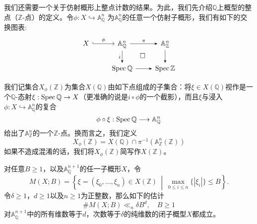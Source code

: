 我们还需要一个关于仿射概形上整点计数的结果。为此，我们先介绍$\mathbb{Q}$上概型的整点（$\mathbb{Z}$-点）的定义。令$\phi: X \hookrightarrow \mathbb{A}^n_{\mathbb{Q}}$ 为$\mathbb{A}^n_{\mathbb{Q}}$的任意一个仿射子概形，我们有如下的交换图表:
\begin{equation}
\begin{tikzcd}[arrows = {-Stealth}]
X \arrow[r, hookrightarrow, "\phi"] & \mathbb{A}^n_{\mathbb{Q}} \arrow[r, "\pi"] \arrow[d, "i"'] \arrow[dr, phantom, "\square"] & \mathbb{A}^n_{\mathbb{Z}} \arrow[d] \\
& \spec\mathbb{Q} \arrow[r] & \spec\mathbb{Z}
\end{tikzcd}
\end{equation}
\begin{definition} \label{Z-point of a Q-scheme}
我们记集合$X_{\phi}(\mathbb{Z})$为集合$X(\mathbb{Q})$由如下点组成的子集合：将$\xi \in X(\mathbb{Q})$视作是一个$\mathbb{Q}$-态射$\xi: \operatorname{Spec}\mathbb{Q}\to X$（更准确的说是$i\circ\phi$的一个截影），而且$\xi$与浸入$\phi: X \hookrightarrow \mathbb{A}^n_{\mathbb{Q}}$的复合
\begin{equation}
\phi\circ\xi: \operatorname{Spec}\mathbb{Q} \longrightarrow \mathbb{A}^n_{\mathbb{Q}}
\end{equation}
给出了$\mathbb{A}^n_{\mathbb{Z}}$的一个$\mathbb{Z}$-点。换而言之，我们定义
\begin{equation}
X_{\phi}(\mathbb{Z}) = X(\mathbb{Q}) \cap \pi^{-1}(\mathbb{A}^n_{\mathbb{Z}}(\mathbb{Z}))
\end{equation}
如果不造成混淆的话，我们将$X_{\phi}(\mathbb{Z})$简写作$X(\mathbb{Z})$。
\end{definition}

\begin{lemma} \label{affine cone lemma}
对任意$B \geqslant 1$，以及$\mathbb{A}^{n+1}_{\mathbb{Q}}$的任一子概形$X$，令
\begin{equation} \label{M(X;B)}
M(X;B) = \left\{ \xi = (\xi_0,\ldots,\xi_n) \in X(\mathbb{Z}) \ \middle|\ \max_{0 \leqslant i \leqslant n} \{|\xi_i|\} \leqslant B \right\}.
\end{equation}
令$\delta \geqslant 1$，$d \geqslant 1$以及$n \geqslant 1$为正整数，那么如下的估计
\begin{equation} \label{estimate of M(X;B)}
\#M(X;B) \ll_{n} \delta B^{d}, \quad B \geqslant 1
\end{equation}
对$\mathbb{A}^{n+1}_{\mathbb{Q}}$中的所有维数等于$d$，次数等于$\delta$的纯维数的闭子概型$X$都成立。
\end{lemma}

